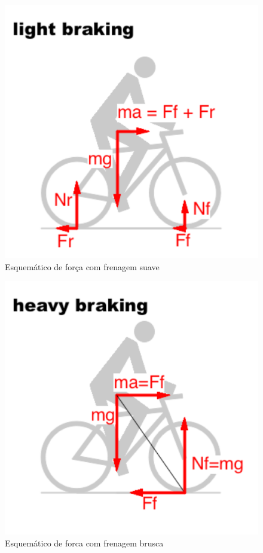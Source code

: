 		\graphicspath{{figuras/}}
		\begin{figure}[h!]
		\centering
		\includegraphics[scale=0.80]{esq_forca_com_frenagem_suave.png}
		\caption{Esquemático de força com frenagem suave}
		\label{img:esq_forca_com_frenagem_suave}
		\end{figure}
		
		\graphicspath{{figuras/}}
		\begin{figure}[h!]
		\centering
		\includegraphics[scale=0.80]{esq_forca_com_frenagem_brusca.png}
		\caption{Esquemático de forca com frenagem brusca}
		\label{img:esq_forca_com_frenagem_brusca}
		\end{figure}

